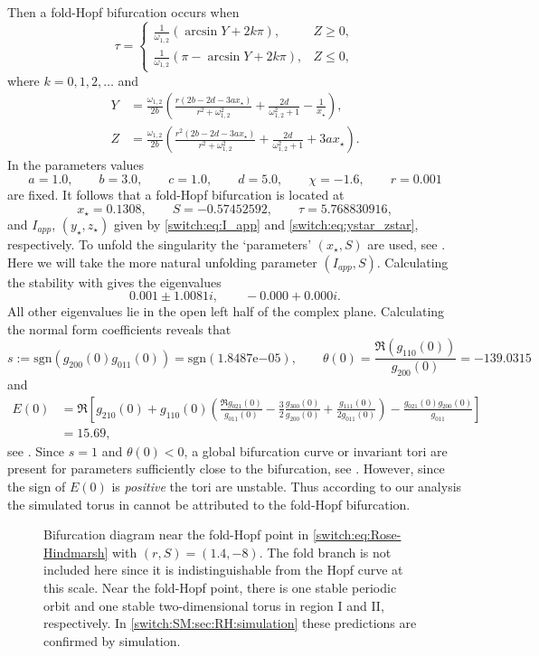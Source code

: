 Then a fold-Hopf bifurcation occurs when
\[
\tau=\begin{cases}
\frac{1}{\omega_{1,2}}\left(\arcsin Y+2k\pi\right), & Z\geq0,\\
\frac{1}{\omega_{1,2}}\left(\pi-\arcsin Y+2k\pi\right), & Z\leq0,
\end{cases}
\]
where $k=0,1,2,\dots$ and
\begin{align*}
Y &= \frac{\omega_{1,2}}{2b}\left(\frac{r  (2b-2d-3ax_\star)}{r^{2}+\omega_{1,2}^{2}}+\frac{2d}{\omega_{1,2}^{2}+1}-\frac{1}{x_{\star}}\right), \\
Z &= \frac{\omega_{1,2}}{2b}\left(\frac{r^2(2b-2d-3ax_\star)}{r^2+\omega_{1,2}^2}+\frac{2 d}{\omega_{1,2}^2+1} +3ax_\star \right).
\end{align*}
In \cite{Ma2011} the parameters values
\begin{equation}
a=1.0,\qquad b=3.0,\qquad c=1.0,\qquad d=5.0,\qquad\chi=-1.6,\qquad r=0.001\label{switch:eq:rose_hindmarsh_pm1}
\end{equation}
are fixed. It follows that a fold-Hopf bifurcation is located at
\[
x_{\star}=0.1308,\qquad S=-0.57452592,\qquad\tau=5.768830916,
\]
and $I_{app}$, $(y_\star,z_\star)$ given by \cref{switch:eq:I_app} and \cref{switch:eq:ystar_zstar}, respectively. To unfold the singularity the `parameters' $(x_{\star},S)$ are used, see \cite{Ma2011}. Here we will take the more natural unfolding parameter $(I_{app},S)$. Calculating the stability with \DDEBIFTOOL gives the eigenvalues
\[
0.001\pm1.0081i,\qquad-0.000+0.000i.
\]
All other eigenvalues lie in the open left half of the complex plane. Calculating the normal form coefficients reveals that
\[
s := \mbox{sgn}(g_{200}(0)g_{011}(0)) = \mbox{sgn}(1.8487\mathrm{e}{-05}),
\qquad  \theta(0)=\frac{\Re(g_{110}(0))}{g_{200}(0)}=-139.0315
\]
and
\begin{align*}
E(0) &= \Re\left[g_{210}(0)+g_{110}(0)\left({\displaystyle \frac{\Re g_{021}(0)}{g_{011}(0)}-\frac{3}{2}\frac{g_{300}(0)}{g_{200}(0)}+\frac{g_{111}(0)}{2g_{011}(0)}}\right) -{\displaystyle \frac{g_{021}(0) g_{200}(0) }{g_{011}}}\right] \\
     &=15.69,
\end{align*}
see \cite[page 338]{Kuznetsov2004}. Since $s=1$ and $\theta(0)<0$, a global bifurcation curve or invariant tori are present for parameters sufficiently close to the bifurcation, see \cite[page 342]{Kuznetsov2004}. However, since the sign of $E(0)$ is \emph{positive} the tori are unstable. Thus according to our analysis the simulated torus in \cite{Ma2011} cannot be attributed to the fold-Hopf bifurcation.
%
\begin{figure}[ht]
\centering
{}
\caption{\label{switch:fig:Rose-Hindmarsh_bifurcation_diagram}Bifurcation diagram near
  the fold-Hopf point in \cref{switch:eq:Rose-Hindmarsh} with $(r,S)=(1.4,-8)$. The
  fold branch is not included here since it is indistinguishable from the Hopf
  curve at this scale. Near the fold-Hopf point, there is one stable periodic
  orbit and one stable two-dimensional torus in region I and II, respectively. In
\cref{switch:SM:sec:RH:simulation} these predictions are confirmed by simulation.
}
\end{figure}
%


